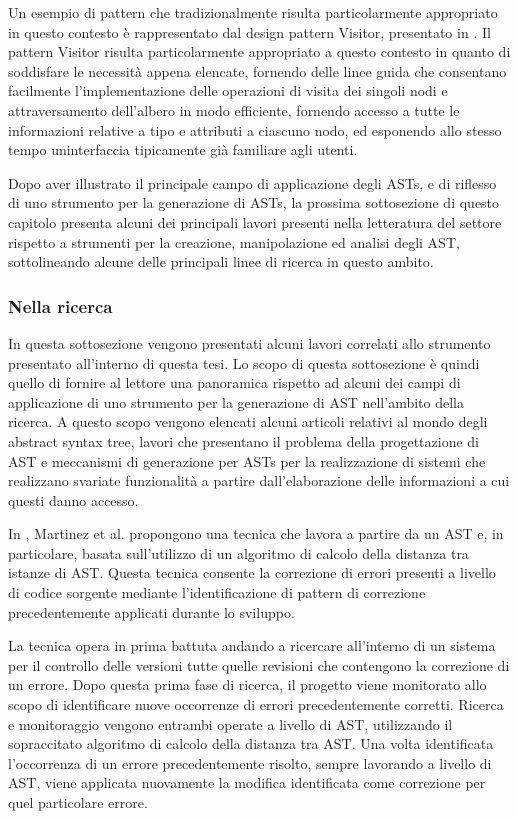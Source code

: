 Un esempio di pattern che tradizionalmente risulta particolarmente appropriato
in questo contesto è rappresentato dal design pattern Visitor, presentato in
\cite{gamma1995design}. Il pattern Visitor risulta particolarmente appropriato a
questo contesto in quanto di soddisfare le necessità appena elencate, fornendo
delle linee guida che consentano facilmente l’implementazione delle operazioni
di visita dei singoli nodi e attraversamento dell’albero in modo efficiente,
fornendo accesso a tutte le informazioni relative a tipo e attributi a ciascuno
nodo, ed esponendo allo stesso tempo uninterfaccia tipicamente già familiare
agli utenti.

Dopo aver illustrato il principale campo di applicazione degli ASTs, e di
riflesso di uno strumento per la generazione di ASTs, la prossima sottosezione
di questo capitolo presenta alcuni dei principali lavori presenti nella
letteratura del settore rispetto a strumenti per la creazione, manipolazione ed
analisi degli AST, sottolineando alcune delle principali linee di ricerca in
questo ambito.

\subsubsection{Nella ricerca}
\label{ast-research}

In questa sottosezione vengono presentati alcuni lavori correlati allo strumento
presentato all’interno di questa tesi. Lo scopo di questa sottosezione è quindi
quello di fornire al lettore una panoramica rispetto ad alcuni dei campi di
applicazione di uno strumento per la generazione di AST nell'ambito della
ricerca. A questo scopo vengono elencati alcuni articoli relativi al mondo degli
abstract syntax tree, lavori che presentano il problema della progettazione di
AST e meccanismi di generazione per ASTs per la realizzazione di sistemi che
realizzano svariate funzionalità a partire dall’elaborazione delle informazioni
a cui questi danno accesso.

In \cite{martinez2014accurate}, Martinez et al. propongono una tecnica che
lavora a partire da un AST e, in particolare, basata sull’utilizzo di un
algoritmo di calcolo della distanza tra istanze di AST. Questa tecnica consente
la correzione di errori presenti a livello di codice sorgente mediante
l’identificazione di pattern di correzione precedentemente applicati durante lo
sviluppo.

La tecnica opera in prima battuta andando a ricercare all’interno di un sistema
per il controllo delle versioni tutte quelle revisioni che contengono la
correzione di un errore. Dopo questa prima fase di ricerca, il progetto viene
monitorato allo scopo di identificare nuove occorrenze di errori precedentemente
corretti. Ricerca e monitoraggio vengono entrambi operate a livello di AST,
utilizzando il sopraccitato algoritmo di calcolo della distanza tra AST. Una
volta identificata l’occorrenza di un errore precedentemente risolto, sempre
lavorando a livello di AST, viene applicata nuovamente la modifica identificata
come correzione per quel particolare errore.

